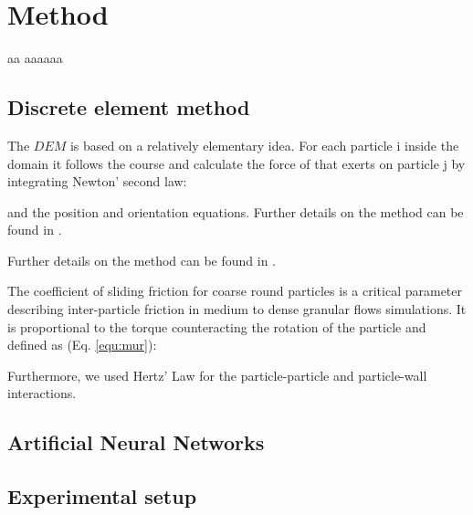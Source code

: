 
\section{Method}
\label{sec:method}



aa
aaaaaa
%

\subsection{Discrete element method}
\label{subsec:dem}
The $DEM$ is based on a relatively elementary idea. For each particle i inside
the domain it follows the course and calculate the force of that exerts on particle j
by integrating Newton' second law:

and the position and orientation equations.
Further details on the method can be found in \cite{RefWorks:133}.


Further details on the method can be found in \cite{RefWorks:133}.

The coefficient of sliding friction for coarse round particles is a critical
parameter describing inter-particle friction in medium to dense granular flows simulations.
It is proportional to the torque counteracting the rotation of the particle and defined as (Eq. \ref{equ:mur}):


Furthermore, we used Hertz' Law for the particle-particle and particle-wall interactions.



\subsection{Artificial Neural Networks}
\label{subsec:ann}
\lipsum[1]


\subsection{Experimental setup}
\label{subsec:experimentalsetup}
\lipsum[1]


